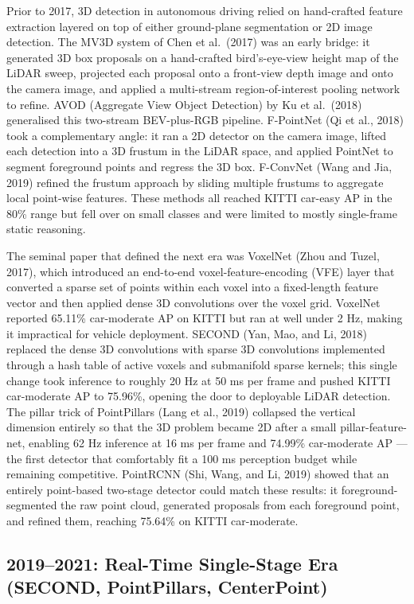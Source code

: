 Prior to 2017, 3D detection in autonomous driving relied on hand-crafted feature extraction layered on top of either ground-plane segmentation or 2D image detection. The MV3D system of Chen et al.~(2017) was an early bridge: it generated 3D box proposals on a hand-crafted bird's-eye-view height map of the LiDAR sweep, projected each proposal onto a front-view depth image and onto the camera image, and applied a multi-stream region-of-interest pooling network to refine. AVOD (Aggregate View Object Detection) by Ku et al.~(2018) generalised this two-stream BEV-plus-RGB pipeline. F-PointNet (Qi et al., 2018) took a complementary angle: it ran a 2D detector on the camera image, lifted each detection into a 3D frustum in the LiDAR space, and applied PointNet to segment foreground points and regress the 3D box. F-ConvNet (Wang and Jia, 2019) refined the frustum approach by sliding multiple frustums to aggregate local point-wise features. These methods all reached KITTI car-easy AP in the 80\% range but fell over on small classes and were limited to mostly single-frame static reasoning.

The seminal paper that defined the next era was VoxelNet (Zhou and Tuzel, 2017), which introduced an end-to-end voxel-feature-encoding (VFE) layer that converted a sparse set of points within each voxel into a fixed-length feature vector and then applied dense 3D convolutions over the voxel grid. VoxelNet reported 65.11\% car-moderate AP on KITTI but ran at well under 2 Hz, making it impractical for vehicle deployment. SECOND (Yan, Mao, and Li, 2018) replaced the dense 3D convolutions with sparse 3D convolutions implemented through a hash table of active voxels and submanifold sparse kernels; this single change took inference to roughly 20 Hz at 50 ms per frame and pushed KITTI car-moderate AP to 75.96\%, opening the door to deployable LiDAR detection. The pillar trick of PointPillars (Lang et al., 2019) collapsed the vertical dimension entirely so that the 3D problem became 2D after a small pillar-feature-net, enabling 62 Hz inference at 16 ms per frame and 74.99\% car-moderate AP --- the first detector that comfortably fit a 100 ms perception budget while remaining competitive. PointRCNN (Shi, Wang, and Li, 2019) showed that an entirely point-based two-stage detector could match these results: it foreground-segmented the raw point cloud, generated proposals from each foreground point, and refined them, reaching 75.64\% on KITTI car-moderate.

\subsection{2019--2021: Real-Time Single-Stage Era (SECOND, PointPillars, CenterPoint)}\label{real-time-single-stage-era-second-pointpillars-centerpoint}

